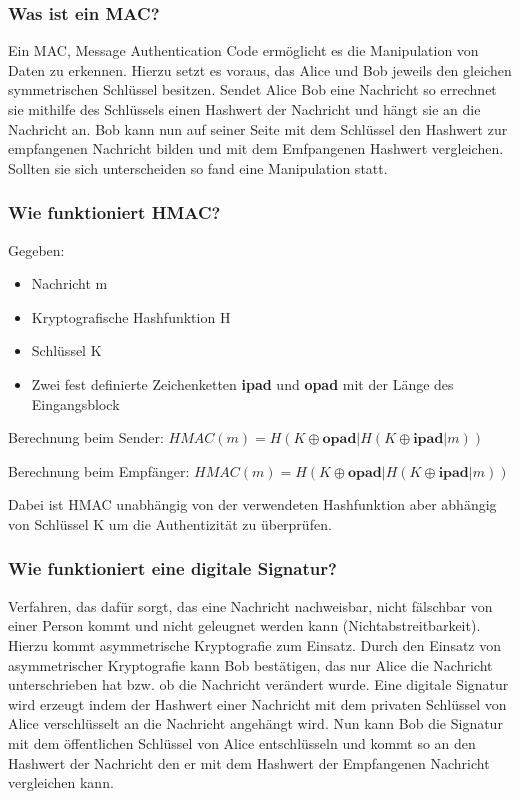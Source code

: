 	\subsubsection{Was ist ein MAC?}
	Ein MAC, Message Authentication Code ermöglicht es die Manipulation von Daten zu erkennen. Hierzu setzt es voraus, das Alice und Bob jeweils den gleichen symmetrischen Schlüssel besitzen. Sendet Alice Bob eine Nachricht so errechnet sie mithilfe des Schlüssels einen Hashwert der Nachricht und hängt sie an die Nachricht an. Bob kann nun auf seiner Seite mit dem Schlüssel den Hashwert zur empfangenen Nachricht bilden und mit dem Emfpangenen Hashwert vergleichen. Sollten sie sich unterscheiden so fand eine Manipulation statt.
	
	\subsubsection{Wie funktioniert HMAC?}
	Gegeben: 
	\begin{itemize}
		\item Nachricht m
		\item Kryptografische Hashfunktion H
		\item Schlüssel K
		\item Zwei fest definierte Zeichenketten \textbf{ipad} und \textbf{opad} mit der Länge des Eingangsblock
	\end{itemize}
	
	Berechnung beim Sender: $HMAC(m) = H(K \oplus \textbf{opad} | H(K \oplus \textbf{ipad}|m))$
	
	
	Berechnung beim Empfänger: $HMAC(m) = H(K \oplus \textbf{opad} | H(K \oplus \textbf{ipad} |m))$
	
	Dabei ist HMAC unabhängig von der verwendeten Hashfunktion aber abhängig von Schlüssel K um die Authentizität zu überprüfen.
	
	\subsubsection{Wie funktioniert eine digitale Signatur?}
	Verfahren, das dafür sorgt, das eine Nachricht nachweisbar, nicht fälschbar von einer Person kommt und nicht geleugnet werden kann (Nichtabstreitbarkeit). Hierzu kommt asymmetrische Kryptografie zum Einsatz. Durch den Einsatz von asymmetrischer Kryptografie kann Bob bestätigen, das nur Alice die Nachricht unterschrieben hat bzw. ob die Nachricht verändert wurde.
	Eine digitale Signatur wird erzeugt indem der Hashwert einer Nachricht mit dem privaten Schlüssel von Alice verschlüsselt an die Nachricht angehängt wird. Nun kann Bob die Signatur mit dem öffentlichen Schlüssel von Alice entschlüsseln und kommt so an den Hashwert der Nachricht den er mit dem Hashwert der Empfangenen Nachricht vergleichen kann.
	
